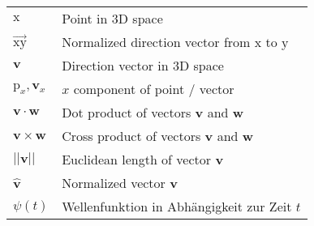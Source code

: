 \documentclass[thesis.tex]{subfiles}
\begin{document}

\begin{tabular}{ l l }
$\mathrm{x}$ & Point in 3D space \\
$\overrightarrow{\mathrm{x}\mathrm{y}}$ & Normalized direction vector from $\mathrm{x}$ to $\mathrm{y}$\\
$\mathbf{v}$ & Direction vector in 3D space \\
$\mathrm{p}_x, \mathbf{v}_x$ & $x$ component of point / vector\\
$\mathbf{v} \cdot \mathbf{w}$ & Dot product of vectors $\mathbf{v}$ and $\mathbf{w}$\\
$\mathbf{v} \times \mathbf{w}$ & Cross product of vectors $\mathbf{v}$ and $\mathbf{w}$\\
$||\mathbf{v}||$ & Euclidean length of vector $\mathbf{v}$\\
$\hat{\mathbf{v}}$ & Normalized vector $\mathbf{v}$ \\
$\psi (t)$ & Wellenfunktion in Abhängigkeit zur Zeit $t$
\end{tabular}
\end{document}
